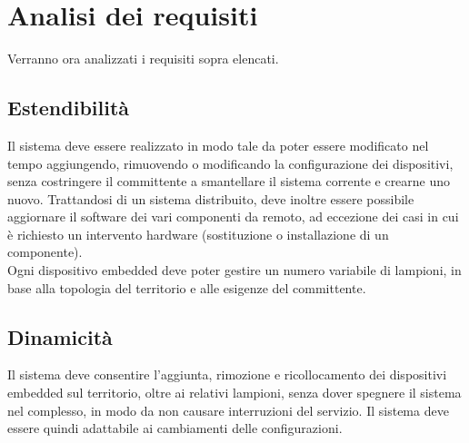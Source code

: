 \section{Analisi dei requisiti}
Verranno ora analizzati i requisiti sopra elencati.

\subsection{Estendibilità}
Il sistema deve essere realizzato in modo tale da poter essere modificato nel tempo aggiungendo, rimuovendo o modificando la configurazione dei dispositivi, senza costringere il committente a smantellare il sistema corrente e crearne uno nuovo.
Trattandosi di un sistema distribuito, deve inoltre essere possibile aggiornare il software dei vari componenti da remoto, ad eccezione dei casi in cui è richiesto un intervento hardware (sostituzione o installazione di un componente).
\\Ogni dispositivo embedded deve poter gestire un numero variabile di lampioni, in base alla topologia del territorio e alle esigenze del committente.

\subsection{Dinamicità}
Il sistema deve consentire l'aggiunta, rimozione e ricollocamento dei dispositivi embedded sul territorio, oltre ai relativi lampioni, senza dover spegnere il sistema nel complesso, in modo da non causare interruzioni del servizio.
Il sistema deve essere quindi adattabile ai cambiamenti delle configurazioni.

